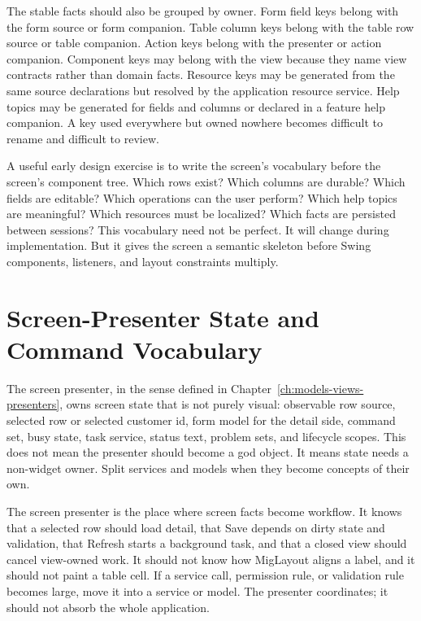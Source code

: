 The stable facts should also be grouped by owner. Form field keys belong with
the form source or form companion. Table column keys belong with the table row
source or table companion. Action keys belong with the presenter or action
companion. Component keys may belong with the view because they name view
contracts rather than domain facts. Resource keys may be generated from the
same source declarations but resolved by the application resource service.
Help topics may be generated for fields and columns or declared in a feature
help companion. A key used everywhere but owned nowhere becomes difficult to
rename and difficult to review.

A useful early design exercise is to write the screen's vocabulary before the
screen's component tree. Which rows exist? Which columns are durable? Which
fields are editable? Which operations can the user perform? Which help topics
are meaningful? Which resources must be localized? Which facts are persisted
between sessions? This vocabulary need not be perfect. It will change during
implementation. But it gives the screen a semantic skeleton before Swing
components, listeners, and layout constraints multiply.

\section{Screen-Presenter State and Command Vocabulary}

The screen presenter, in the sense defined in Chapter~\ref{ch:models-views-presenters}, owns screen state that is not purely visual: observable row
source, selected row or selected customer id, form model for the detail side,
command set, busy state, task service, status text, problem sets, and lifecycle
scopes. This does not mean the presenter should become a god object. It means
state needs a non-widget owner. Split services and models when they become
concepts of their own.

The screen presenter is the place where screen facts become workflow. It knows that a
selected row should load detail, that Save depends on dirty state and
validation, that Refresh starts a background task, and that a closed view
should cancel view-owned work. It should not know how MigLayout aligns a
label, and it should not paint a table cell. If a service call, permission
rule, or validation rule becomes large, move it into a service or model. The
presenter coordinates; it should not absorb the whole application.

